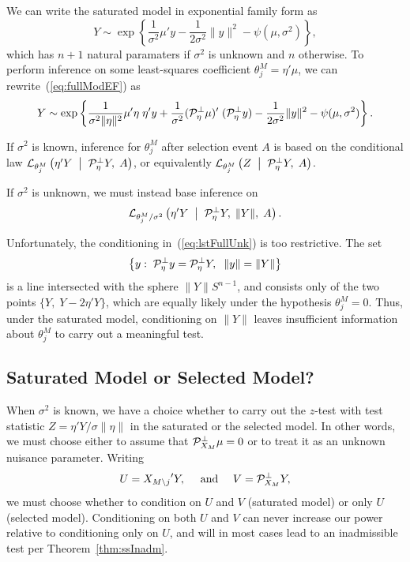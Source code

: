 \documentclass{article}
\theoremstyle{definition}
\newcommand{\bX}{X}
\newcommand{\Gv}{\;\;\big|\;\;}
\newcommand{\proj}{\cP}
\newcommand{\cL}{\mathcal{L}}
\begin{document}
We can write the saturated model in exponential family form as
\begin{equation}\label{eq:fullModEF}
  Y \sim \exp\left\{ \frac{1}{\sigma^2}\mu ' y - \frac{1}{2\sigma^2} \|y\|^2 - \psi(\mu,\sigma^2)\right\},
\end{equation}
which has $n+1$ natural paramaters if $\sigma^2$ is unknown and $n$ otherwise. To perform inference on some least-squares coefficient $\theta_j^{M}=\eta'\mu$, we can rewrite~(\ref{eq:fullModEF}) as
\begin{equation}
  Y \sim \exp\left\{ \frac{1}{\sigma^2\|\eta\|^2} \mu'\eta\; \eta'y +
    \frac{1}{\sigma^2} (\proj_{\eta}^\perp\mu)'\; (\proj_\eta^\perp y)
    - \frac{1}{2\sigma^2}\|y\|^2 - \psi(\mu,\sigma^2)\right\}.
\end{equation}

If $\sigma^2$ is known, inference for $\theta_j^{M}$ after selection event $A$ is based on the conditional law $\cL_{\theta_j^{M}}\left( \eta'Y \Gv \proj_\eta^\perp Y, \; A\right)$, or equivalently $\cL_{\theta_j^{M}}\left( Z \Gv \proj_\eta^\perp Y, \; A\right)$.

If $\sigma^2$ is unknown, we must instead base inference on
\begin{equation}\label{eq:lstFullUnk}
  \cL_{\theta_j^{M}/\sigma^2}\left(\eta'Y \Gv \proj_\eta^\perp Y, \; \|Y\|, \; A\right).
\end{equation}

Unfortunately, the conditioning in~(\ref{eq:lstFullUnk}) is too restrictive. The set
\begin{equation}
  \left\{y:\; \proj_\eta^\perp y = \proj_\eta^\perp Y,\;\; \|y\| = \|Y\| \right\}
\end{equation}
is a line intersected with the sphere $\|Y\|S^{n-1}$, and consists only of the two points $\{Y, \; Y - 2\eta'Y\}$, which are equally likely under the hypothesis $\theta_j^{M}=0$. Thus, under the saturated model, conditioning on $\|Y\|$ leaves insufficient information about $\theta_j^{M}$ to carry out a meaningful test.


\subsection{Saturated Model or Selected Model?}\label{sec:fullVLinear}

When $\sigma^2$ is known, we have a choice whether to carry out the $z$-test with test statistic $Z = \eta'Y/\sigma \|\eta\|$ in the saturated or the selected model. In other words, we must choose either to assume that $\proj_{\bX_M}^\perp \mu = 0$ or to treat it as an unknown nuisance parameter. Writing
\begin{equation}
  U = {\bX_{M\setminus j}}' Y, \quad \text{ and } \quad V = \proj_{\bX_M}^\perp Y,
\end{equation}
we must choose whether to condition on $U$ and $V$ (saturated model) or only $U$ (selected model). Conditioning on both $U$ and $V$ can never increase our power relative to conditioning only on $U$, and will in most cases lead to an inadmissible test per Theorem~\ref{thm:ssInadm}.
\end{document}
